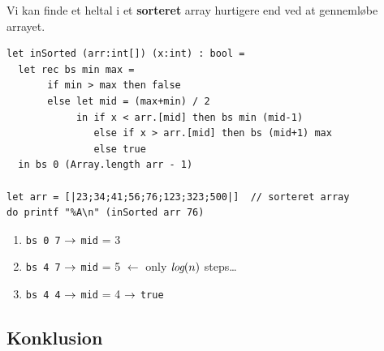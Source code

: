 \documentclass[rgb]{beamer}
\begin{document}
\begin{frame}[fragile]
\begin{footnotesize}


  Vi kan finde et heltal i et \textbf{sorteret} array hurtigere end ved at gennemløbe arrayet.

\begin{lstlisting}[numbers=none,frame=none,mathescape]
let inSorted (arr:int[]) (x:int) : bool =
  let rec bs min max =
       if min > max then false
       else let mid = (max+min) / 2
            in if x < arr.[mid] then bs min (mid-1)
               else if x > arr.[mid] then bs (mid+1) max
               else true
  in bs 0 (Array.length arr - 1)

let arr = [|23;34;41;56;76;123;323;500|]  // sorteret array
do printf "%A\n" (inSorted arr 76)
\end{lstlisting}

  \vspace{.5ex}
\begin{enumerate}
\item \lstinline{bs 0 7} $\rightarrow$ \lstinline{mid} = 3
\item \lstinline{bs 4 7} $\rightarrow$ \lstinline{mid} = 5  \hfill $\longleftarrow$ only $\mbox{\it{log}}(n)$ steps\ldots
\item \lstinline{bs 4 4} $\rightarrow$ \lstinline{mid} = 4 $\rightarrow$ \lstinline{true}
\end{enumerate}

\end{footnotesize}
\end{frame}

\subsection*{Konklusion}
\begin{frame}[fragile]

  \vspace{3mm}
  \tableofcontents
\end{frame}
\end{document}
